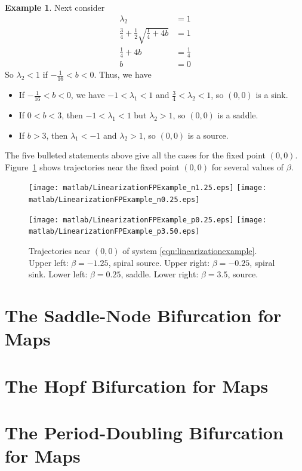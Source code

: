 \documentclass[reqno]{immbook}
\numberwithin{equation}{chapter}
\numberwithin{question}{section}
\numberwithin{theorem}{chapter}
\numberwithin{figure}{chapter}
\theoremstyle{definition}
\newtheorem{example}{Example}[section]
\begin{document}
\begin{example}
Next consider
\begin{equation}
\begin{split}
   \lambda_2 & = 1 \\
   \frac{3}{4} + \frac{1}{2} \sqrt{\frac{1}{4}+4b} & = 1 \\
   \frac{1}{4}+4b & = \frac{1}{4} \\
   b & = 0
\end{split}
\end{equation}
So $\lambda_2 < 1$ if $-\frac{1}{16} < b < 0$.
Thus, we have
\begin{itemize}
\item
If $-\frac{1}{16} < b < 0$, we have $-1 < \lambda_1 < 1$ and $\frac{3}{4} < \lambda_2 < 1$, so
$(0,0)$ is a sink.
\item
If $0 < b < 3$, then $-1 < \lambda_1 < 1$ but $\lambda_2 > 1$, so 
$(0,0)$ is a saddle.
\item
If $b > 3$, then $\lambda_1 < -1$ and $\lambda_2 > 1$, so
$(0,0)$ is a source.
\end{itemize}
The five bulleted statements above give all the cases for the
fixed point $(0,0)$.
Figure~\ref{fig:LinearizationFPExamples} shows trajectories
near the fixed point $(0,0)$ for several values of $\beta$.
\begin{figure}
\centerline{%
\texttt{[image: matlab/LinearizationFPExample\_n1.25.eps]}
\texttt{[image: matlab/LinearizationFPExample\_n0.25.eps]}
}
\centerline{%
\texttt{[image: matlab/LinearizationFPExample\_p0.25.eps]}
\texttt{[image: matlab/LinearizationFPExample\_p3.50.eps]}
}
\caption{Trajectories near $(0,0)$ of system
\eqref{eqn:linearizationexample}. Upper left: $\beta=-1.25$, spiral source.
Upper right: $\beta=-0.25$, spiral sink.
Lower left: $\beta=0.25$, saddle.
Lower right: $\beta=3.5$, source.}
\label{fig:LinearizationFPExamples}
\end{figure}
\end{example}

\section{The Saddle-Node Bifurcation for Maps}

\section{The Hopf Bifurcation for Maps}

\section{The Period-Doubling Bifurcation for Maps}
\end{document}
